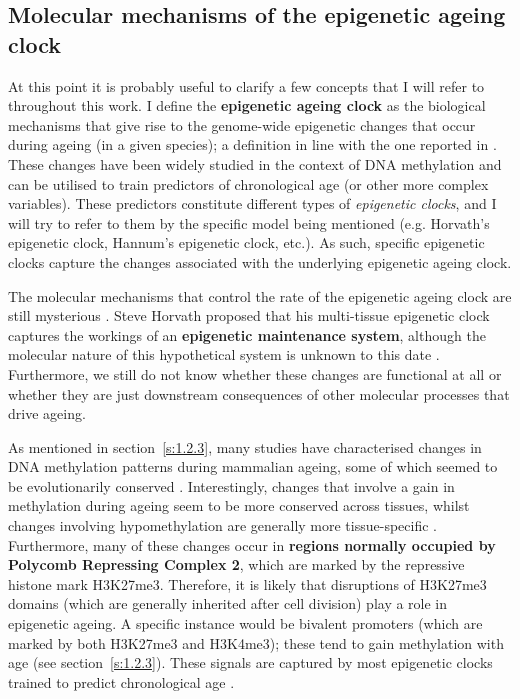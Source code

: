 \smallskip

\subsection{Molecular mechanisms of the epigenetic ageing clock} \label{s:1.3.3}

\smallskip

At this point it is probably useful to clarify a few concepts that I will refer to throughout this work. I define the \textbf{epigenetic ageing clock} as the biological mechanisms that give rise to the genome-wide epigenetic changes that occur during ageing (in a given species); a definition in line with the one reported in \citep{Horvath2018}. These changes have been widely studied in the context of DNA methylation and can be utilised to train predictors of chronological age (or other more complex variables). These predictors constitute different types of \textit{epigenetic clocks}, and I will try to refer to them by the specific model being mentioned (e.g. Horvath's epigenetic clock, Hannum's epigenetic clock, etc.). As such, specific epigenetic clocks capture the changes associated with the underlying epigenetic ageing clock.

\bigskip

The molecular mechanisms that control the rate of the epigenetic ageing clock are still mysterious \citep{Horvath2018,Field2018}. Steve Horvath proposed that his multi-tissue epigenetic clock captures the workings of an \textbf{epigenetic maintenance system}, although the molecular nature of this hypothetical system is unknown to this date \citep{Horvath2013}. Furthermore, we still do not know whether these changes are functional at all or whether they are just downstream consequences of other molecular processes that drive ageing. 

\bigskip

As mentioned in section~\ref{s:1.2.3}, many studies have characterised changes in DNA methylation patterns during mammalian ageing, some of which seemed to be evolutionarily conserved \citep{Lowe2018,Horvath2013}. Interestingly, changes that involve a gain in methylation during ageing seem to be more conserved across tissues, whilst changes involving hypomethylation are generally more tissue-specific \citep{Horvath2013,Yang2016}. Furthermore, many of these changes occur in \textbf{regions normally occupied by Polycomb Repressing Complex 2}, which are marked by the repressive histone mark H3K27me3. Therefore, it is likely that disruptions of H3K27me3 domains (which are generally inherited after cell division) play a role in epigenetic ageing. A specific instance would be bivalent promoters (which are marked by both H3K27me3 and H3K4me3); these tend to gain methylation with age (see section~\ref{s:1.2.3}). These signals are captured by most epigenetic clocks trained to predict chronological age \citep{Horvath2018}.

